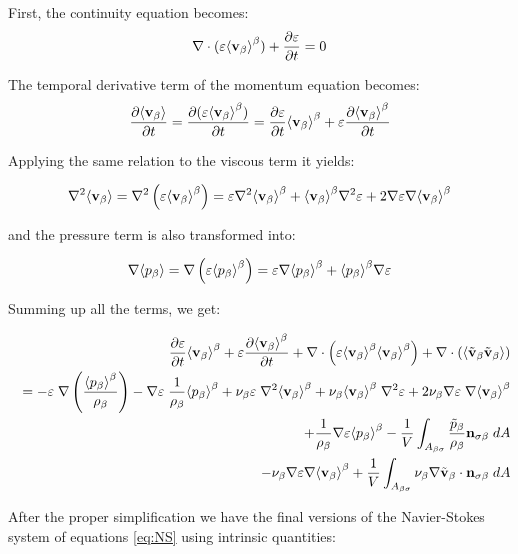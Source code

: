 First, the continuity equation becomes:
$$
\nabla \cdot (\varepsilon\meani{\vb} ) + \derp{\varepsilon}{t}= 0
$$

The temporal derivative term of the momentum equation becomes:
$$
\derp{\means{\vb}}{t} = \derp{(\varepsilon\meani{\vb})}{t} = \derp{\varepsilon}{t}\meani{\vb} + \varepsilon \derp{\meani{\vb}}{t}
$$

Applying the same relation to the viscous term it yields:

\begin{equation}
	\nabla^2 \means{\vb} = \nabla^2 \left( \varepsilon \meani{\vb} \right) = \varepsilon \nabla^2 \meani{\vb} + \meani{\vb} \nabla^2 \varepsilon +2 \nabla \varepsilon \nabla \meani{\vb}
\end{equation}

and the pressure term is also transformed into:

\begin{equation}
\nabla \means{\pb} = \nabla \left( \varepsilon \meani{\pb} \right) = \varepsilon \nabla \meani{\pb} + \meani{\pb} \nabla \varepsilon
\end{equation}

Summing up all the terms, we get:

\begin{eqnarray}
&& \derp{\varepsilon}{t}\meani{\vb} + \varepsilon \derp{\meani{\vb}}{t} + \nabla \cdot \left(\varepsilon \meani{\vb}\meani{\vb}\right)   + \nabla \cdot \left(\means{\vbt \vbt}\right)  \nonumber \\
&&= -\varepsilon \; \nabla \left(\dfrac{\meani{\pb}}{\rho_{\beta}}\right) - \nabla \varepsilon \; \dfrac{1}{\rho_{\beta}} \meani{\pb}  + \nub \varepsilon \; \nabla^2 \meani{\vb} + \nub \meani{\vb} \; \nabla^2 \varepsilon + 2 \nub \nabla \varepsilon \; \nabla \meani{\vb} \nonumber \\
&&+\dfrac{1}{\rho_{\beta}}\nabla\varepsilon \meani{\pb} - \dfrac{1}{V} \int_{A_{\beta \sigma}} \dfrac{\pbt}{\rho_{\beta}} \nbs \;dA \nonumber \\
&&- \nub \nabla \varepsilon \nabla \meani{\vb} + \dfrac{1}{V} \int_{A_{\beta \sigma}} \nub \nabla \vbt \cdot \nbs \;dA
\end{eqnarray}

After the proper simplification we have the final versions of the Navier-Stokes system of equations \eqref{eq:NS} using intrinsic quantities:

